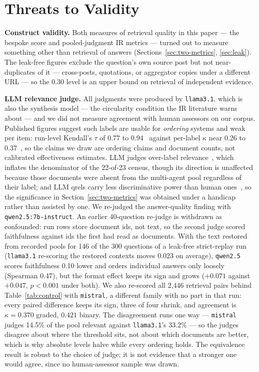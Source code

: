 \documentclass[10pt,conference]{IEEEtran}
\begin{document}
\section{Threats to Validity}\label{sec:threats}

\textbf{Construct validity.} Both measures of retrieval quality in this paper ---
the bespoke score and pooled-judgment IR metrics --- turned out to measure
something other than retrieval of answers
(Sections~\ref{sec:two-metrics}, \ref{sec:leak}). The leak-free figures exclude the
question's own source post but not near-duplicates of it --- cross-posts,
quotations, or aggregator copies under a different URL --- so the 0.30 level is an
upper bound on retrieval of independent evidence.

\textbf{LLM relevance judge.} All judgments were produced by \texttt{llama3.1},
which is also the synthesis model --- the circularity condition the IR literature
warns about --- and we did not measure agreement with human assessors on our
corpus. Published figures suggest such labels are usable for \emph{ordering}
systems and weak per item: run-level Kendall's $\tau$ of 0.77 to
0.94~\cite{upadhyay2024umbrela,thomas2024preferences} against per-label $\kappa$
near 0.26 to 0.37~\cite{upadhyay2024umbrela,faggioli2023perspectives}, so the
claims we draw are ordering claims and document counts, not calibrated
effectiveness estimates. LLM judges over-label
relevance~\cite{alaofi2024fooled}, which inflates the denominator of the 22-of-23
census, though its direction is unaffected because those documents were absent
from the multi-agent pool regardless of their label; and LLM qrels carry less
discriminative power than human ones~\cite{faggioli2023perspectives}, so the
significance in Section~\ref{sec:two-metrics} was obtained under a handicap rather
than assisted by one. We re-judged the answer-quality finding with \texttt{qwen2.5:7b-instruct}. An
earlier 40-question re-judge is withdrawn as confounded: run rows store document ids, not
text, so the second judge scored faithfulness against ids the first had read as documents.
With the text restored from recorded pools for 146 of the 300 questions of a leak-free
strict-replay run (\texttt{llama3.1} re-scoring the restored contexts moves 0.023 on
average), \texttt{qwen2.5} scores faithfulness 0.10 lower and orders individual answers
only loosely (Spearman 0.47), but the format effect keeps its sign and grows ($+0.071$
against $+0.047$, $p<0.001$ under both). We also re-scored all
2{,}446 retrieval pairs behind Table~\ref{tab:control} with \texttt{mistral}, a
different family with no part in that run: every paired difference keeps its sign,
three of four shrink, and agreement is $\kappa=0.370$ graded, $0.421$ binary. The
disagreement runs one way --- \texttt{mistral} judges 14.5\% of the pool relevant
against \texttt{llama3.1}'s 33.2\% --- so the judges disagree about where the
threshold sits, not about which documents are better, which is why absolute levels
halve while every ordering holds. The equivalence result is robust to the choice of
judge; it is not evidence that a stronger one would agree, since no human-assessor
sample was drawn.
\end{document}
